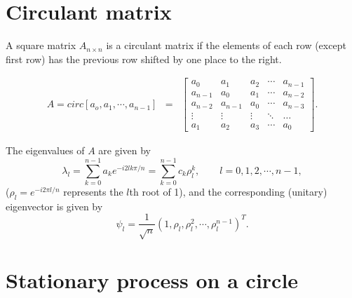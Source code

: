 
\section{Circulant matrix}

A square matrix $A_{n\times n}$ is a circulant matrix if the elements of each row (except first row) has the previous row shifted by one place to the right.

\begin{eqnarray}
	A = circ[a_o, a_1,\cdots,a_{n-1}] &=& \left[
		\begin{array}{lllll}
			a_0     & a_1     & a_2    & \cdots & a_{n-1} \\
			a_{n-1} & a_0     & a_1    & \cdots & a_{n-2} \\
			a_{n-2} & a_{n-1} & a_0    & \cdots & a_{n-3} \\
			\vdots  & \vdots  & \vdots & \ddots & \ldots  \\
			a_1     & a_2     & a_3    & \cdots & a_0     
		\end{array}
	\right].
\end{eqnarray}

The eigenvalues of $A$ are given by
\[
	\lambda_l = \sum_{k=0}^{n-1} a_k e^{-i2lk\pi/n} = \sum_{k=0}^{n-1}c_k \rho_l^k, \quad \quad l = 0, 1, 2, \cdots, n-1,
\]
($\rho_l = e^{-i2\pi l/n}$ represents the $l$th root of 1), and the corresponding (unitary) eigenvector is given by
\[
	\psi_l = \frac{1}{\sqrt{n}}(1, \rho_l, \rho_l^2, \cdots, \rho_l^{n-1})^T.
\]


\section{Stationary process on a circle}

